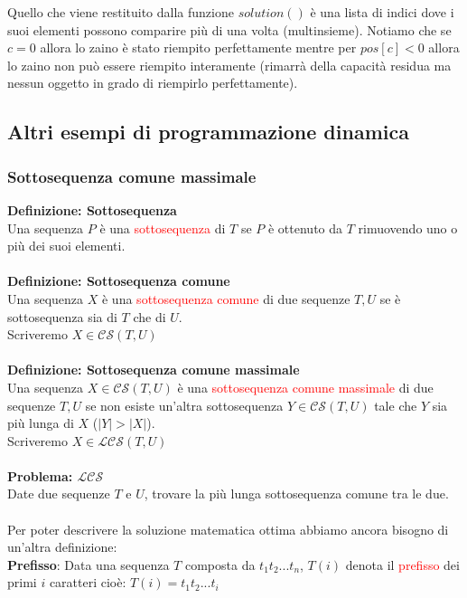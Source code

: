 \documentclass[../cheatSheetAlgoritmi.tex]{subfiles}
\begin{document}
Quello che viene restituito dalla funzione $solution()$ è una lista di indici dove i suoi elementi possono comparire più di una volta (multinsieme). Notiamo che se $c=0$ allora lo zaino è stato riempito perfettamente mentre per $pos[c]<0$ allora lo zaino non può essere riempito interamente (rimarrà della capacità residua ma nessun oggetto in grado di riempirlo perfettamente).
\newpage
\subsection{Altri esempi di programmazione dinamica} 
\subsubsection{Sottosequenza comune massimale}
\textbf{Definizione: Sottosequenza}\\
Una sequenza $P$ è una \textcolor{red}{sottosequenza} di $T$ se $P$ è ottenuto da $T$ rimuovendo uno o più dei suoi elementi.\\\\
\textbf{Definizione: Sottosequenza comune}\\
Una sequenza $X$ è una \textcolor{red}{sottosequenza comune} di due sequenze $T, U$ se è sottosequenza sia di $T$ che di $U$.\\
Scriveremo $X \in \mathcal{CS}(T, U)$\\\\
\textbf{Definizione: Sottosequenza comune massimale}\\
Una sequenza $X \in \mathcal{CS}(T, U)$ è una \textcolor{red}{sottosequenza comune massimale} di due sequenze $T, U$ se non esiste un'altra sottosequenza $Y \in \mathcal{CS}(T, U)$ tale che $Y$ sia più lunga di $X$  ($|Y| > |X|$).\\
Scriveremo $X \in \mathcal{LCS}(T, U)$\\\\
\textbf{Problema: $\mathcal{LCS}$}\\
Date due sequenze $T$ e $U$, trovare la più lunga sottosequenza comune tra le due.\\\\
Per poter descrivere la soluzione matematica ottima abbiamo ancora bisogno di un'altra definizione:\\
\textbf{Prefisso}: Data una sequenza $T$ composta da $t_{1}t_{2}...t_{n}$, $T(i)$ denota il \textcolor{red}{prefisso} dei primi $i$ caratteri cioè: $T(i) = t_{1}t_{2}...t_{i}$\\\\
\end{document}
